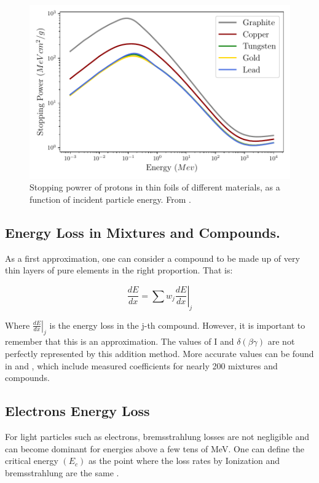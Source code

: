  \begin{figure}[h]
    \centering
    \includegraphics[width=0.7\columnwidth]{EdepMetal/EneDepMetal.pdf}
    \caption{Stopping powrer of protons in thin foils of different materials, as a function of incident particle energy. From \parencite*[][]{ref:NIST}.}
    \label{fig:EneDep}
\end{figure}

\subsection{Energy Loss in Mixtures and Compounds.}

As a first approximation, one can consider a compound to be made up of very thin layers of pure elements in the right proportion. That is: 

 \begin{equation}
    \frac{dE}{dx} =  \sum w_j \left.\frac{dE}{dx} \right\vert_j
 \end{equation}

Where $\left. \frac{dE}{dx}\right\vert_j$  is the energy loss in the j-th compound. However, it is important to remember that this is an approximation. The values of I and $\delta (\beta\gamma)$ are not perfectly represented by this addition method. More accurate values can be found in \parencite*[][]{ref:compound1} and \parencite*[][]{ref:compound2}, which include measured coefficients for nearly 200 mixtures and compounds. 

\subsection{Electrons Energy Loss}

For light particles such as electrons, bremsstrahlung losses are not negligible and can become dominant for energies above a few tens of \si[]{\mega\electronvolt}. One can define the critical energy $(E_c)$ as the point where the loss rates by Ionization and bremsstrahlung are the same \parencite*[][]{ref:EleCricEne}. 

